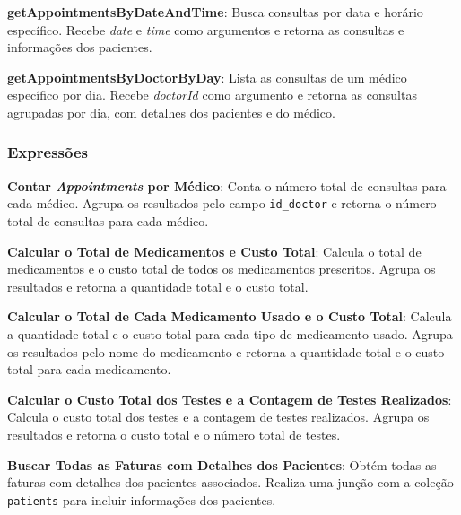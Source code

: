 \textbf{getAppointmentsByDateAndTime}: Busca consultas por data e horário específico. Recebe \textit{date} e \textit{time} como argumentos e retorna as consultas e informações dos pacientes.

\vspace{0.15cm}

\textbf{getAppointmentsByDoctorByDay}: Lista as consultas de um médico específico por dia. Recebe \textit{doctorId} como argumento e retorna as consultas agrupadas por dia, com detalhes dos pacientes e do médico.

\subsubsection{Expressões}

\vspace{0.15cm}

\textbf{Contar \textit{Appointments} por Médico}: Conta o número total de consultas para cada médico. Agrupa os resultados pelo campo \texttt{id\_doctor} e retorna o número total de consultas para cada médico.

\vspace{0.15cm}

\textbf{Calcular o Total de Medicamentos e Custo Total}: Calcula o total de medicamentos e o custo total de todos os medicamentos prescritos. Agrupa os resultados e retorna a quantidade total e o custo total.

\vspace{0.15cm}

\textbf{Calcular o Total de Cada Medicamento Usado e o Custo Total}: Calcula a quantidade total e o custo total para cada tipo de medicamento usado. Agrupa os resultados pelo nome do medicamento e retorna a quantidade total e o custo total para cada medicamento.

\vspace{0.15cm}

\textbf{Calcular o Custo Total dos Testes e a Contagem de Testes Realizados}: Calcula o custo total dos testes e a contagem de testes realizados. Agrupa os resultados e retorna o custo total e o número total de testes.

\vspace{0.15cm}

\textbf{Buscar Todas as Faturas com Detalhes dos Pacientes}: Obtém todas as faturas com detalhes dos pacientes associados. Realiza uma junção com a coleção \texttt{patients} para incluir informações dos pacientes.

